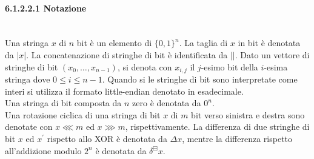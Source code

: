 \paragraph{6.1.2.2.1 Notazione}\mbox{}\\
Una stringa $x$ di $n$ bit è un elemento di $\{0,1\}^n$. La taglia di $x$ in bit è denotata da $|x|$. La concatenazione di stringhe di bit è identificata da $||$. Dato un vettore di stringhe di bit $(x_0, \ldots, x_{n-1})$, si denota con $x_{i,j}$ il $j$-esimo bit della $i$-esima stringa dove $0 \leq i \leq n-1$. Quando si le stringhe di bit sono interpretate come interi si utilizza il formato little-endian denotato in esadecimale.\\
Una stringa di bit composta da $n$ zero è denotata da $0^n$.\\
Una rotazione ciclica di una stringa di bit $x$ di $m$ bit verso sinistra e destra sono denotate con $x \lll m$ ed $x \ggg m$, rispettivamente. La differenza di due stringhe di bit $x$ ed $x^\prime$ rispetto allo XOR è denotata da $\Delta x$, mentre la differenza rispetto all'addizione modulo $2^n$ è denotata da $\delta^{\boxminus}x$.
